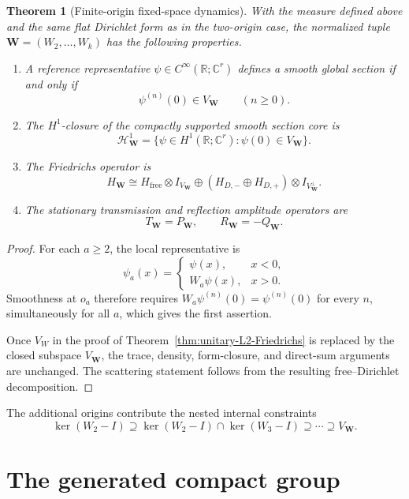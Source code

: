 \documentclass[11pt]{article}
\theoremstyle{plain}
\newtheorem{theorem}{Theorem}[section]
\theoremstyle{definition}
\newcommand{\R}{\mathbb{R}}
\newcommand{\C}{\mathbb{C}}
\begin{document}
\begin{theorem}[Finite-origin fixed-space dynamics]
\label{thm:unitary-Lk-main}
With the measure defined above and the same flat Dirichlet form as in the two-origin case, the normalized tuple
\(\mathbf W=(W_2,\ldots,W_k)\) has the following properties.

\begin{enumerate}
\item A reference representative \(\psi\in C^\infty(\R;\C^r)\) defines a smooth global section if and only if
\[
\psi^{(n)}(0)\in V_{\mathbf W}
\qquad(n\geq0).
\]

\item The \(H^1\)-closure of the compactly supported smooth section core is
\[
\mathcal H_{\mathbf W}^1
=
\{\psi\in H^1(\R;\C^r):\psi(0)\in V_{\mathbf W}\}.
\]

\item The Friedrichs operator is
\[
H_{\mathbf W}
\cong
H_{\mathrm{free}}\otimes I_{V_{\mathbf W}}
\oplus
(H_{D,-}\oplus H_{D,+})\otimes I_{V_{\mathbf W}^\perp}.
\]

\item The stationary transmission and reflection amplitude operators are
\[
T_{\mathbf W}=P_{\mathbf W},
\qquad
R_{\mathbf W}=-Q_{\mathbf W}.
\]
\end{enumerate}
\end{theorem}

\begin{proof}
For each \(a\geq2\), the local representative is
\[
\psi_a(x)=
\begin{cases}
\psi(x),&x<0,\\
W_a\psi(x),&x>0.
\end{cases}
\]
Smoothness at \(o_a\) therefore requires
\(W_a\psi^{(n)}(0)=\psi^{(n)}(0)\) for every \(n\), simultaneously for all \(a\), which gives the first assertion.

Once \(V_W\) in the proof of Theorem~\ref{thm:unitary-L2-Friedrichs} is replaced by the closed subspace \(V_{\mathbf W}\), the trace, density, form-closure, and direct-sum arguments are unchanged. The scattering statement follows from the resulting free--Dirichlet decomposition.
\end{proof}

The additional origins contribute the nested internal constraints
\[
\ker(W_2-I)
\supseteq
\ker(W_2-I)\cap\ker(W_3-I)
\supseteq\cdots\supseteq
V_{\mathbf W}.
\]

\section{The generated compact group}
\label{sec:generated-group}
\end{document}
